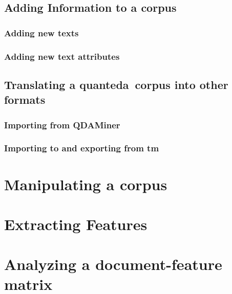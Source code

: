 \documentclass[11pt]{article}
\newcommand{\quanteda}{\textsf{quanteda}\ }
\begin{document}
\subsection{Adding Information to a corpus}

\subsubsection{Adding new texts}

\subsubsection{Adding new text attributes}


\subsection{Translating a \quanteda corpus into other formats}

\subsubsection{Importing from QDAMiner}

\subsubsection{Importing to and exporting from \textsf{tm}}


\section{Manipulating a corpus}


\section{Extracting Features}


\section{Analyzing a document-feature matrix}







\end{document}
